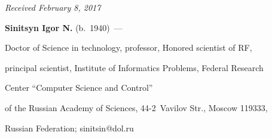 \vspace*{-3pt}



\hfill{\small\textit{Received February 8, 2017}}









\Contrl



\noindent

\textbf{Sinitsyn Igor N.} (b.\ 1940)~--- 

Doctor of Science in technology, professor, Honored scientist of RF, 

principal scientist, Institute of Informatics Problems, Federal Research 

Center ``Computer Science and Control'' 

of the Russian Academy of Sciences, 44-2~Vavilov Str., Moscow 119333, 

Russian Federation; \mbox{sinitsin@dol.ru}







\label{end\stat}





\renewcommand{\bibname}{\protect\rm Литература}

